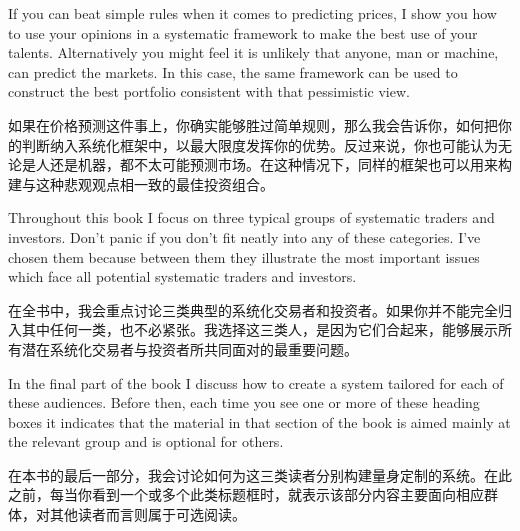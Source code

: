 \bipairgap

\begin{englishblock} If you can beat simple rules when it comes to predicting prices, I show you how to use your opinions in a systematic framework to make the best use of your talents. Alternatively you might feel it is unlikely that anyone, man or machine, can predict the markets. In this case, the same framework can be used to construct the best portfolio consistent with that pessimistic view. \end{englishblock}

\begin{chineseblock}如果在价格预测这件事上，你确实能够胜过简单规则，那么我会告诉你，如何把你的判断纳入系统化框架中，以最大限度发挥你的优势。反过来说，你也可能认为无论是人还是机器，都不太可能预测市场。在这种情况下，同样的框架也可以用来构建与这种悲观观点相一致的最佳投资组合。\end{chineseblock}


\begin{englishblock} Throughout this book I focus on three typical groups of systematic traders and investors. Don't panic if you don't fit neatly into any of these categories. I've chosen them because between them they illustrate the most important issues which face all potential systematic traders and investors. \end{englishblock}

\begin{chineseblock}在全书中，我会重点讨论三类典型的系统化交易者和投资者。如果你并不能完全归入其中任何一类，也不必紧张。我选择这三类人，是因为它们合起来，能够展示所有潜在系统化交易者与投资者所共同面对的最重要问题。\end{chineseblock}

\bipairgap

\begin{englishblock} In the final part of the book I discuss how to create a system tailored for each of these audiences. Before then, each time you see one or more of these heading boxes it indicates that the material in that section of the book is aimed mainly at the relevant group and is optional for others. \end{englishblock}

\begin{chineseblock}在本书的最后一部分，我会讨论如何为这三类读者分别构建量身定制的系统。在此之前，每当你看到一个或多个此类标题框时，就表示该部分内容主要面向相应群体，对其他读者而言则属于可选阅读。\end{chineseblock}

